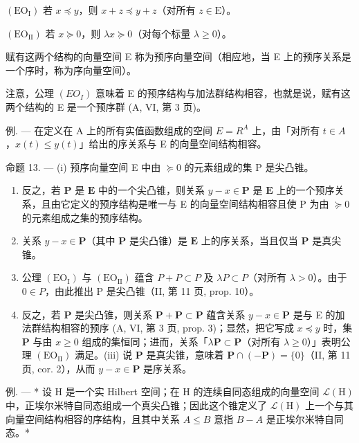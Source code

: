\((\mathrm{EO}_{\mathrm{I}})\) 若 \(x \preccurlyeq y\)，则 \(x + z \preccurlyeq y + z\)（对所有 \(z \in \mathrm{E}\)）。

\((\mathrm{EO}_{\mathrm{II}})\) 若 \(x \succcurlyeq 0\)，则 \(\lambda x \succcurlyeq 0\)（对每个标量 \(\lambda \geqslant 0\)）。

赋有这两个结构的向量空间 E 称为预序向量空间（相应地，当 E 上的预序关系是一个序时，称为序向量空间）。

注意，公理 \((EO_{I})\) 意味着 E 的预序结构与加法群结构相容，也就是说，赋有这两个结构的 E 是一个预序群 (A, VI, 第 3 页)。

例. --- 在定义在 A 上的所有实值函数组成的空间 \(E = R^{A}\) 上，由「对所有 \(t \in A\)，\(x(t) \leqslant y(t)\)」给出的序关系与 E 的向量空间结构相容。

命题 13. --- (i) 预序向量空间 E 中由 \(\succcurlyeq 0\) 的元素组成的集 P 是尖凸锥。

\begin{enumerate}
\def\labelenumi{(\roman{enumi})}
\setcounter{enumi}{1}
\item
  反之，若 \(\mathbf{P}\) 是 \(\mathbf{E}\) 中的一个尖凸锥，则关系 \(y - x \in \mathbf{P}\) 是 \(\mathbf{E}\) 上的一个预序关系，且由它定义的预序结构是唯一与 E 的向量空间结构相容且使 P 为由 \(\succcurlyeq 0\) 的元素组成之集的预序结构。
\item
  关系 \(y - x \in \mathbf{P}\)（其中 \(\mathbf{P}\) 是尖凸锥）是 \(\mathbf{E}\) 上的序关系，当且仅当 \(\mathbf{P}\) 是真尖锥。
\item
  公理 \((\mathrm{EO}_{\mathrm{I}})\) 与 \((\mathrm{EO}_{\mathrm{II}})\) 蕴含 \(P + P \subset P\) 及 \(\lambda P \subset P\)（对所有 \(\lambda > 0\)）。由于 \(0 \in P\)，由此推出 P 是尖凸锥（II, 第 11 页, prop. 10）。
\item
  反之，若 \(\mathbf{P}\) 是尖凸锥，则关系 \(\mathbf{P} + \mathbf{P} \subset \mathbf{P}\) 蕴含关系 \(y - x \in \mathbf{P}\) 是与 E 的加法群结构相容的预序 (A, VI, 第 3 页, prop. 3)；显然，把它写成 \(x \preccurlyeq y\) 时，集 \(\mathbf{P}\) 与由 \(x \geqslant 0\) 组成的集恒同；进而，关系「\(\lambda \mathbf{P} \subset \mathbf{P}\)（对所有 \(\lambda \geqslant 0\)）」表明公理 \((\mathrm{EO}_{\mathrm{II}})\) 满足。(iii) 说 \(\mathbf{P}\) 是真尖锥，意味着 \(\mathbf{P} \cap (-\mathbf{P}) = \{0\}\)（II, 第 11 页, cor. 2），从而 \(y - x \in \mathbf{P}\) 是序关系。
\end{enumerate}

例. --- * 设 H 是一个实 Hilbert 空间；在 H 的连续自同态组成的向量空间 \(\mathcal{L}(\mathrm{H})\) 中，正埃尔米特自同态组成一个真尖凸锥；因此这个锥定义了 \(\mathcal{L}(\mathrm{H})\) 上一个与其向量空间结构相容的序结构，且其中关系 \(A \leqslant B\) 意指 \(B - A\) 是正埃尔米特自同态。*

